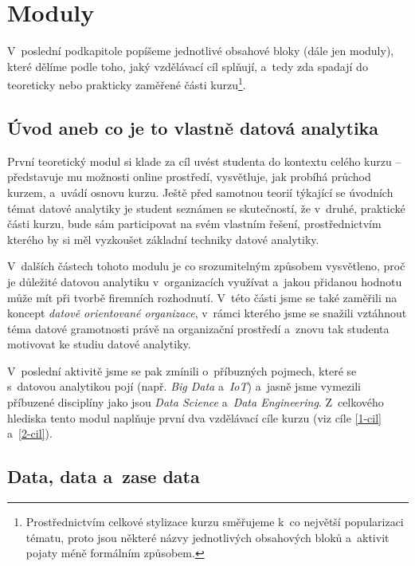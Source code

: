 \hypertarget{moduly}{%
\section{Moduly}\label{moduly}}

V~poslední podkapitole popíšeme jednotlivé obsahové bloky (dále jen moduly), které dělíme podle toho, jaký vzdělávací cíl splňují, a~tedy zda spadají do teoreticky nebo prakticky zaměřené části kurzu\footnote{Prostřednictvím celkové stylizace kurzu směřujeme k~co největší popularizaci tématu, proto jsou některé názvy jednotlivých obsahových bloků a~aktivit pojaty méně formálním způsobem.}.

\hypertarget{uxfavod-aneb-co-je-to-vlastnux11b-datovuxe1-analytika}{%
\subsection{Úvod aneb co je to vlastně datová analytika}\label{uxfavod-aneb-co-je-to-vlastnux11b-datovuxe1-analytika}}

První teoretický modul si klade za cíl uvést studenta do kontextu celého kurzu -- představuje mu možnosti online prostředí, vysvětluje, jak probíhá průchod kurzem, a~uvádí osnovu kurzu. Ještě před samotnou teorií týkající se úvodních témat datové analytiky je student seznámen se skutečností, že v~druhé, praktické části kurzu, bude sám participovat na svém vlastním řešení, prostřednictvím kterého by si měl vyzkoušet základní techniky datové analytiky.

V~dalších částech tohoto modulu je co srozumitelným způsobem vysvětleno, proč je důležité datovou analytiku v~organizacích využívat a~jakou přidanou hodnotu může mít při tvorbě firemních rozhodnutí. V~této části jsme se také zaměřili na koncept \emph{datově orientované organizace}, v~rámci kterého jsme se snažili vztáhnout téma datové gramotnosti právě na organizační prostředí a~znovu tak studenta motivovat ke studiu datové analytiky.

V~poslední aktivitě jsme se pak zmínili o~příbuzných pojmech, které se s~datovou analytikou pojí (např. \emph{Big Data} a~\emph{IoT}) a~jasně jsme vymezili příbuzené disciplíny jako jsou \emph{Data Science} a~\emph{Data Engineering}. Z~celkového hlediska tento modul naplňuje první dva vzdělávací cíle kurzu (viz cíle \ref{1-cil} a~\ref{2-cil}).

\hypertarget{data-data-a-zase-data}{%
\subsection{Data, data a~zase data}\label{data-data-a-zase-data}}

